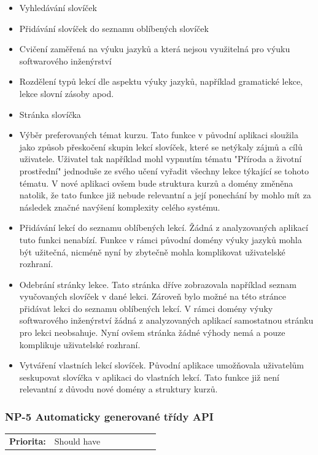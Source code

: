 \begin{itemize}
    \item Vyhledávání slovíček
    \item Přidávání slovíček do seznamu oblíbených slovíček
    \item Cvičení zaměřená na výuku jazyků a která nejsou využitelná pro výuku softwarového inženýrství
    \item Rozdělení typů lekcí dle aspektu výuky jazyků, například gramatické lekce, lekce slovní zásoby apod.
    \item Stránka slovíčka
    \item Výběr preferovaných témat kurzu. Tato funkce v původní aplikaci sloužila jako způsob přeskočení skupin lekcí slovíček, které se netýkaly zájmů a cílů uživatele. Uživatel tak například mohl vypnutím tématu "Příroda a životní prostřední" jednoduše ze svého učení vyřadit všechny lekce týkající se tohoto tématu. V nové aplikaci ovšem bude struktura kurzů a domény změněna natolik, že tato funkce již nebude relevantní a její ponechání by mohlo mít za následek značné navýšení komplexity celého systému.
    \item Přidávání lekcí do seznamu oblíbených lekcí. Žádná z analyzovaných aplikací tuto funkci nenabízí. Funkce v rámci původní domény výuky jazyků mohla být užitečná, nicméně nyní by zbytečně mohla komplikovat uživatelské rozhraní.
    \item Odebrání stránky lekce. Tato stránka dříve zobrazovala například seznam vyučovaných slovíček v dané lekci. Zároveň bylo možné na této stránce přidávat lekci do seznamu oblíbených lekcí. V rámci domény výuky softwarového inženýrství žádná z analyzovaných aplikací samostatnou stránku pro lekci neobsahuje. Nyní ovšem stránka žádné výhody nemá a pouze komplikuje uživatelské rozhraní.
    \item Vytváření vlastních lekcí slovíček. Původní aplikace umožňovala uživatelům seskupovat slovíčka v aplikaci do vlastních lekcí. Tato funkce již není relevantní z důvodu nové domény a struktury kurzů.
\end{itemize}

\subsubsection{NP-5 Automaticky generované třídy API}

\begin{tabular}{lp{0.7\linewidth}}
    \textbf{Priorita:} & Should have \\
\end{tabular}

